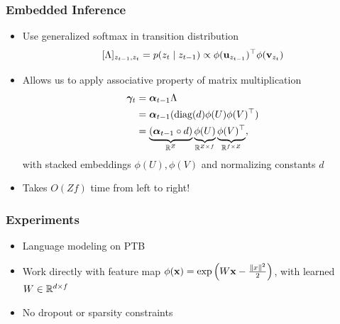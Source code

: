 \documentclass{beamer}
\begin{document}
\begin{frame}
\frametitle{Embedded Inference}
\begin{itemize}
\item Use generalized softmax in transition distribution
$$[\Lambda]_{z_{t-1},z_t} = p(z_t\mid z_{t-1}) \propto \phi(\mathbf{u}_{z_{t-1}})^\top\phi(\mathbf{v}_{z_t})$$
\item Allows us to apply associative property of matrix multiplication
\begin{align*}
\bm\gamma_t
&= \bm\alpha_{t-1}\Lambda\\
&= \bm\alpha_{t-1}(\textrm{diag}(d)\phi(U)\phi(V)^\top)\\
&= \underbrace{(\bm\alpha_{t-1}\circ d)}_{\mathbb{R}^Z}
\underbrace{\phi(U)}_{\mathbb{R}^{Z \times f}}
\underbrace{\phi(V)^\top}_{\mathbb{R}^{f \times Z}},
\end{align*}
with stacked embeddings $\phi(U),\phi(V)$
and normalizing constants $d$
\vspace{1em}
\item Takes $O(Zf)$ time from left to right!
\end{itemize}
\end{frame}

\begin{frame}
\frametitle{Experiments}
\begin{itemize}
\item Language modeling on PTB
\vspace{2em}
\item Work directly with feature map $\phi(\mathbf{x}) = \exp\left(W\mathbf{x} - \frac{\|x\|^2}{2}\right)$,
with learned $W\in\mathbb{R}^{d \times f}$
\vspace{2em}
\item No dropout or sparsity constraints
\end{itemize}
\end{frame}

\end{document}
